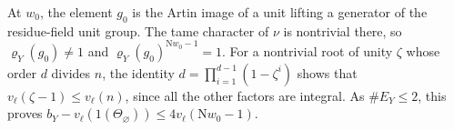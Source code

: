 At \(w_0\), the element \(g_0\) is the Artin image of a unit lifting a generator of the
residue-field unit group. The tame character of \(\nu\) is nontrivial there, so
\(\varrho_Y(g_0)\ne1\) and \(\varrho_Y(g_0)^{\mathrm Nw_0-1}=1\).
For a nontrivial root of unity \(\zeta\) whose order \(d\) divides \(n\),
the identity \(d=\prod_{i=1}^{d-1}(1-\zeta^i)\) shows that
\(v_\ell(\zeta-1)\le v_\ell(n)\), since all the other factors are integral.
As \(\#E_Y\le2\), this proves
\(b_Y-v_\ell(1(\Theta_\varnothing))\le4v_\ell(\mathrm Nw_0-1)\).
